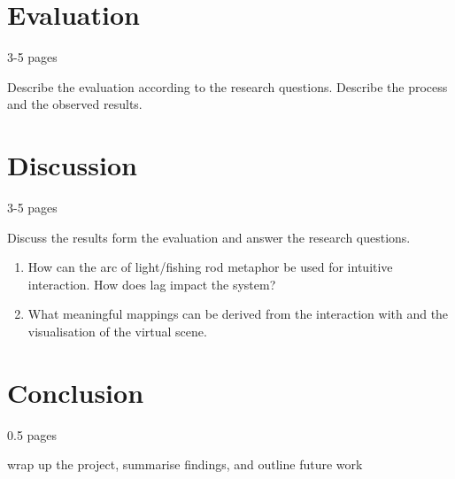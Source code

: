 \documentclass[10pt,a4paper]{scrartcl}
\begin{document}
\section{Evaluation}
3-5 pages

Describe the evaluation according to the research questions. Describe the process and the observed results.


\section{Discussion}
3-5 pages

Discuss the results form the evaluation and answer the research questions. 

\begin{enumerate}
\item How can the arc of light/fishing rod metaphor be used for intuitive interaction. How does lag impact the system?
\item What meaningful mappings can be derived from the interaction with and the visualisation of the virtual scene.
\end{enumerate}

\section{Conclusion}
0.5 pages

wrap up the project, summarise findings, and outline future work






\end{document}
